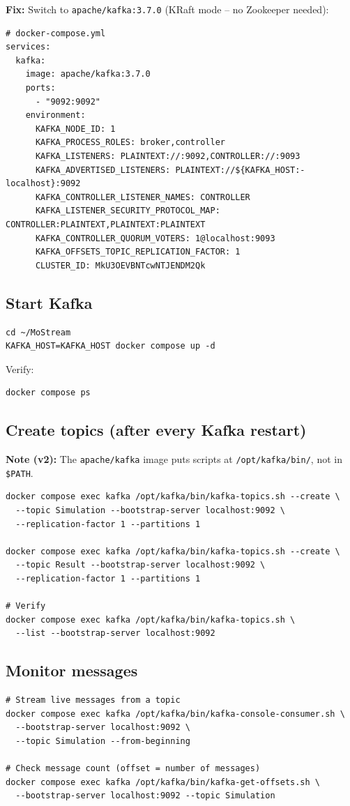 \documentclass[11pt,a4paper]{article}
\begin{document}
\textbf{Fix:} Switch to \texttt{apache/kafka:3.7.0} (KRaft mode -- no Zookeeper needed):
\begin{lstlisting}
# docker-compose.yml
services:
  kafka:
    image: apache/kafka:3.7.0
    ports:
      - "9092:9092"
    environment:
      KAFKA_NODE_ID: 1
      KAFKA_PROCESS_ROLES: broker,controller
      KAFKA_LISTENERS: PLAINTEXT://:9092,CONTROLLER://:9093
      KAFKA_ADVERTISED_LISTENERS: PLAINTEXT://${KAFKA_HOST:-localhost}:9092
      KAFKA_CONTROLLER_LISTENER_NAMES: CONTROLLER
      KAFKA_LISTENER_SECURITY_PROTOCOL_MAP: CONTROLLER:PLAINTEXT,PLAINTEXT:PLAINTEXT
      KAFKA_CONTROLLER_QUORUM_VOTERS: 1@localhost:9093
      KAFKA_OFFSETS_TOPIC_REPLICATION_FACTOR: 1
      CLUSTER_ID: MkU3OEVBNTcwNTJENDM2Qk
\end{lstlisting}

\subsection{Start Kafka}
\begin{lstlisting}
cd ~/MoStream
KAFKA_HOST=KAFKA_HOST docker compose up -d
\end{lstlisting}

Verify:
\begin{lstlisting}
docker compose ps
\end{lstlisting}

\subsection{Create topics (after every Kafka restart)}

\textbf{Note (v2):} The \texttt{apache/kafka} image puts scripts at
\texttt{/opt/kafka/bin/}, not in \texttt{\$PATH}.
\begin{lstlisting}
docker compose exec kafka /opt/kafka/bin/kafka-topics.sh --create \
  --topic Simulation --bootstrap-server localhost:9092 \
  --replication-factor 1 --partitions 1

docker compose exec kafka /opt/kafka/bin/kafka-topics.sh --create \
  --topic Result --bootstrap-server localhost:9092 \
  --replication-factor 1 --partitions 1

# Verify
docker compose exec kafka /opt/kafka/bin/kafka-topics.sh \
  --list --bootstrap-server localhost:9092
\end{lstlisting}

\subsection{Monitor messages}
\begin{lstlisting}
# Stream live messages from a topic
docker compose exec kafka /opt/kafka/bin/kafka-console-consumer.sh \
  --bootstrap-server localhost:9092 \
  --topic Simulation --from-beginning

# Check message count (offset = number of messages)
docker compose exec kafka /opt/kafka/bin/kafka-get-offsets.sh \
  --bootstrap-server localhost:9092 --topic Simulation
\end{lstlisting}
\end{document}
